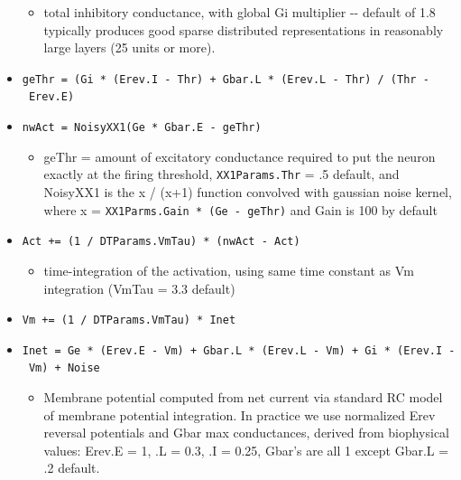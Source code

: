 \documentclass[11pt,twoside]{article}
\newif\myifpdf
\providecommand{\tightlist}{%
  \setlength{\itemsep}{.25in}\setlength{\parskip}{-.25in}}
\begin{document}
\begin{itemize}
    \begin{itemize}
	\tightlist
    \item
      total inhibitory conductance, with global Gi multiplier -\/-
      default of 1.8 typically produces good sparse distributed
      representations in reasonably large layers (25 units or more).
    \end{itemize}
	
  \item \texttt{geThr\ =\ (Gi\ *\ (Erev.I\ -\ Thr)\ +\ Gbar.L\ *\ (Erev.L\ -\ Thr)\ /\ (Thr\ -\ Erev.E)}

  \item \texttt{nwAct\ =\ NoisyXX1(Ge\ *\ Gbar.E\ -\ geThr)}

    \begin{itemize}
	\tightlist
    \item
      geThr = amount of excitatory conductance required to put the
      neuron exactly at the firing threshold, \texttt{XX1Params.Thr} =
      .5 default, and NoisyXX1 is the x / (x+1) function convolved with
      gaussian noise kernel, where x = \texttt{XX1Parms.Gain * (Ge - geThr)} and Gain is 100 by default
    \end{itemize}
	
  \item \texttt{Act\ +=\ (1\ /\ DTParams.VmTau)\ *\ (nwAct\ -\ Act)}

    \begin{itemize}
	\tightlist
    \item
      time-integration of the activation, using same time constant as Vm
      integration (VmTau = 3.3 default)
    \end{itemize}
	
  \item \texttt{Vm\ +=\ (1\ /\ DTParams.VmTau)\ *\ Inet}

  \item \texttt{Inet\ =\ Ge\ *\ (Erev.E\ -\ Vm)\ +\ Gbar.L\ *\ (Erev.L\ -\ Vm)\ +\ Gi\ *\ (Erev.I\ -\ Vm)\ +\ Noise}

    \begin{itemize}
	\tightlist
    \item
      Membrane potential computed from net current via standard RC model
      of membrane potential integration. In practice we use normalized
      Erev reversal potentials and Gbar max conductances, derived from
      biophysical values: Erev.E = 1, .L = 0.3, .I = 0.25, Gbar's are
      all 1 except Gbar.L = .2 default.
    \end{itemize}
\end{itemize}
\end{document}

